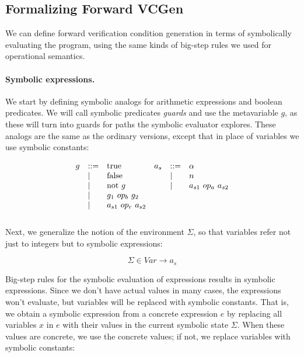 \documentclass[11pt]{article}
\begin{document}
\subsection{Formalizing Forward VCGen} 

We can define forward verification condition generation in terms of symbolically
evaluating the program, using the same kinds of big-step rules we used
for operational semantics.
%

\paragraph{Symbolic expressions.} We start by defining symbolic analogs for arithmetic expressions and boolean
predicates. We will call symbolic predicates \textit{guards} and use the
metavariable $g$, as these will turn into guards for paths the symbolic
evaluator explores. These analogs are the same as the ordinary versions, except
that in place of variables we use symbolic constants:

\newcommand\df{\bnfdef}
\newcommand\da{\bnfalt}

\[
\begin{array}{llllll}
g & \df & \mbox{true}    &a_s& \df & \alpha \\
   & \da & \mbox{false}   &   & \da & n      \\
   & \da & \mbox{not}~ g  &   & \da & a_{s1} ~op_a~ a_{s2} \\ 
   & \da & g_{1} ~op_b~ g_{2} &   &     &            \\
   & \da & a_{s1} ~op_r~ a_{s2} \\[2ex] 
\end{array}
\]

Next, we generalize the notion of the environment $\Sigma$, so that variables refer not
just to integers but to symbolic expressions:

\begin{equation*}
\Sigma \in \textit{Var} \rightarrow a_s
\end{equation*}

Big-step rules for the symbolic evaluation of expressions results in symbolic
expressions. Since we don't have actual values in many cases, the expressions
won't evaluate, but variables will be replaced with symbolic constants.  That
is, we obtain a symbolic expression from a concrete expression $e$ by replacing
all variables $x$ in $e$ with their values in the current symbolic state
$\Sigma$. When these values are concrete, we use the concrete values; if not, we
replace variables with symbolic constants:
\end{document}
